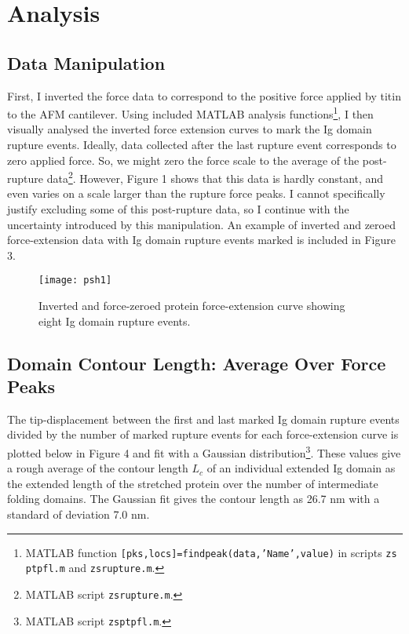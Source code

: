 \documentclass{article}
\begin{document}
\section{Analysis}

\subsection{Data Manipulation}

First, I inverted the force data to correspond to the positive force applied by titin to the
AFM cantilever.
Using included MATLAB analysis functions\footnote{MATLAB function 
\texttt{[pks,locs]=findpeak(data,'Name',value)} in scripts \texttt{zs\textunderscore 
ptp\textunderscore fl.m} and \texttt{zs\textunderscore rupture.m}.},
I then visually analysed the inverted force extension curves to mark the Ig domain
rupture events. Ideally, data collected after the last rupture event corresponds to zero
applied force. So, we might zero the force scale to the average of the post-rupture
data\footnote{MATLAB script \texttt{zs\textunderscore rupture.m}.}. 
However, Figure 1 shows that this data is hardly constant, and even varies on a scale larger
than the rupture force peaks. I cannot specifically justify excluding some of this
post-rupture data, so I continue with the uncertainty introduced by this manipulation.
An example of inverted and zeroed force-extension data with Ig domain rupture events
marked is included in Figure 3.

\begin{figure}[H]
\texttt{[image: psh1]}
\centering
\caption{Inverted and force-zeroed protein force-extension curve showing eight Ig
domain rupture events.}
\end{figure}

\subsection{Domain Contour Length: Average Over Force Peaks}

The tip-displacement between the first and last marked Ig domain rupture events divided
by the number of marked rupture events for each force-extension curve is plotted below in
Figure 4 and fit with a Gaussian
distribution\footnote{MATLAB script \texttt{zs\textunderscore ptp\textunderscore fl.m}.}.
These values give a rough average of the
contour length $L_c$ of an individual extended Ig domain as the extended length of the 
stretched protein over the number of intermediate folding domains. The Gaussian fit gives
the contour length as 26.7 nm with a standard of deviation 7.0 nm.
\end{document}
